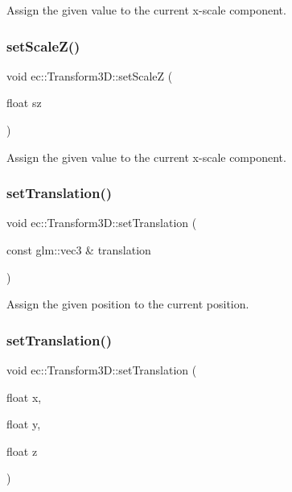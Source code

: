 Assign the given value to the current x-\/scale component. \mbox{\label{classec_1_1_transform3_d_a1a71c829c953e5585623696fd7a4624d}} 
\subsubsection{\texorpdfstring{set\+Scale\+Z()}{setScaleZ()}}
{\footnotesize\ttfamily void ec\+::\+Transform3\+D\+::set\+ScaleZ (\begin{DoxyParamCaption}\item[{float}]{sz }\end{DoxyParamCaption})}

Assign the given value to the current x-\/scale component. \mbox{\label{classec_1_1_transform3_d_a2866183fe28eb5e5360d156830b00655}} 
\subsubsection{\texorpdfstring{set\+Translation()}{setTranslation()}\hspace{0.1cm}{\footnotesize\ttfamily [1/2]}}
{\footnotesize\ttfamily void ec\+::\+Transform3\+D\+::set\+Translation (\begin{DoxyParamCaption}\item[{const glm\+::vec3 \&}]{translation }\end{DoxyParamCaption})}

Assign the given position to the current position. \mbox{\label{classec_1_1_transform3_d_a2671c96409a11a74d9c7cb96d96b274b}} 
\subsubsection{\texorpdfstring{set\+Translation()}{setTranslation()}\hspace{0.1cm}{\footnotesize\ttfamily [2/2]}}
{\footnotesize\ttfamily void ec\+::\+Transform3\+D\+::set\+Translation (\begin{DoxyParamCaption}\item[{float}]{x,  }\item[{float}]{y,  }\item[{float}]{z }\end{DoxyParamCaption})}

